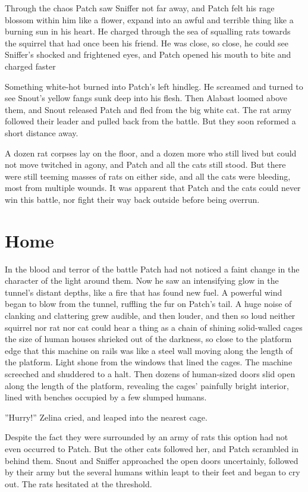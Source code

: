 \documentclass[12pt]{book}
\begin{document}
Through the chaos Patch saw Sniffer not far away, and Patch felt his rage blossom within him like a flower, expand into an awful and terrible thing like a burning sun in his heart. He charged through the sea of squalling rats towards the squirrel that had once been his friend. He was close, so close, he could see Sniffer's shocked and frightened eyes, and Patch opened his mouth to bite and charged faster %

Something white-hot burned into Patch's left hindleg. He screamed and turned to see Snout's yellow fangs sunk deep into his flesh. Then Alabast loomed above them, and Snout released Patch and fled from the big white cat. The rat army followed their leader and pulled back from the battle. But they soon reformed a short distance away.

A dozen rat corpses lay on the floor, and a dozen more who still lived but could not move twitched in agony, and Patch and all the cats still stood. But there were still teeming masses of rats on either side, and all the cats were bleeding, most from multiple wounds. It was apparent that Patch and the cats could never win this battle, nor fight their way back outside before being overrun.


\section{Home}

In the blood and terror of the battle Patch had not noticed a faint change in the character of the light around them. Now he saw an intensifying glow in the tunnel's distant depths, like a fire that has found new fuel. A powerful wind began to blow from the tunnel, ruffling the fur on Patch's tail. A huge noise of clanking and clattering grew audible, and then louder, and then so loud neither squirrel nor rat nor cat could hear a thing as a chain of shining solid-walled cages the size of human houses shrieked out of the darkness, so close to the platform edge that this machine on rails was like a steel wall moving along the length of the platform. Light shone from the windows that lined the cages. The machine screeched and shuddered to a halt. Then dozens of human-sized doors slid open along the length of the platform, revealing the cages' painfully bright interior, lined with benches occupied by a few slumped humans.

''Hurry!'' Zelina cried, and leaped into the nearest cage.

Despite the fact they were surrounded by an army of rats this option had not even occurred to Patch. But the other cats followed her, and Patch scrambled in behind them. Snout and Sniffer approached the open doors uncertainly, followed by their army %
but the several humans within leapt to their feet and began to cry out. The rats hesitated at the threshold.
\end{document}
